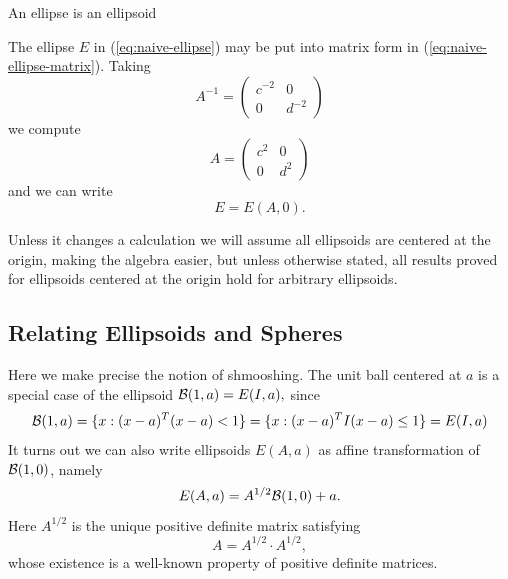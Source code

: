 \begin{examplebox}{An ellipse is an ellipsoid}
  \begin{example}
    The ellipse \(E\) in (\ref{eq:naive-ellipse}) may be put into matrix form
    in (\ref{eq:naive-ellipse-matrix}). Taking
    \[A^{-1} = \left(\begin{matrix} c^{-2} & 0\\ 0 & d^{-2} \end{matrix}\right)\]
    we compute
    \[A = \left(\begin{matrix} c^2 & 0\\ 0 & d^{2} \end{matrix}\right)\]
    and we can write
    \[E = E(A, 0).\]
  \end{example}
\end{examplebox}

Unless it changes a calculation we will assume all ellipsoids are centered at
the origin, making the algebra easier,  but unless otherwise stated, all results
proved for ellipsoids centered at the origin hold for arbitrary ellipsoids.


\subsection{Relating Ellipsoids and Spheres}
Here we make precise the notion of shmooshing.
The unit ball centered at \(a\) is a special case of the ellipsoid
\(\mathcal{B}(1, a) = E(I, a),\) since
%
\[\mathcal{B}(1, a)  = \{x : (x - a)^T(x - a) < 1\} = \{x : (x - a)^T I (x - a) \leq 1\} = E(I, a)\]
%
It turns out we can also write ellipsoids \(E(A, a)\) as affine transformation
of \(\mathcal{B}(1,0)\), namely
%
\[E(A,a) = A^{1/2} \mathcal{B}(1, 0) + a.\]
%
Here \(A^{1/2}\) is the unique positive definite matrix satisfying
\[A = A^{1/2} \cdot A^{1/2},\]
whose existence is a well-known property of positive definite matrices.\\

